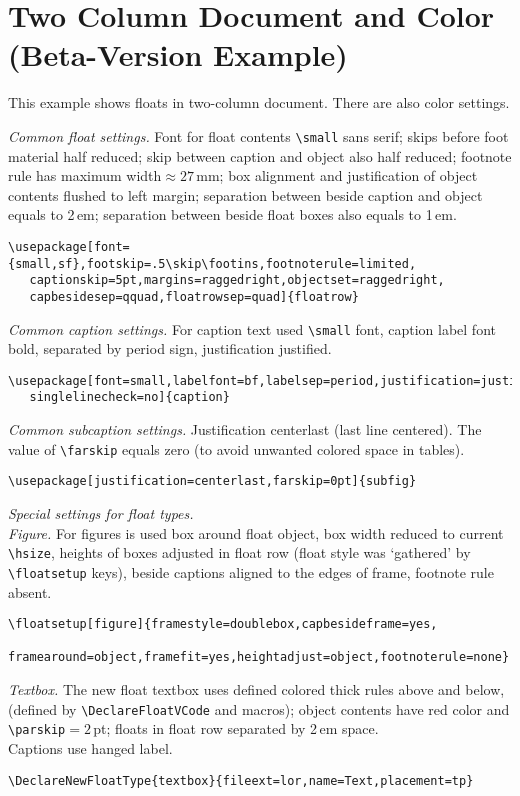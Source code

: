 \documentclass[twocolumn]{book}
\begin{document}

\onecolumn
\begingroup

\chapter{Two Column Document and Color (Beta-Version Example)}

\begin{sl}\fontsize{11}{13.6}\selectfont
This example shows floats in two-column document.
There are also color settings.

\emph{Common float settings.}
Font for float contents \verb|\small| sans serif;
skips before foot material half reduced;
skip between caption and object also half reduced;
footnote rule has maximum width${{}\approx27}$\,mm;
box alignment and justification of object contents flushed to left margin;
separation between beside caption and object equals to 2\,em; separation
between beside float boxes also equals to 1\,em.
\begin{verbatim}
\usepackage[font={small,sf},footskip=.5\skip\footins,footnoterule=limited,
   captionskip=5pt,margins=raggedright,objectset=raggedright,
   capbesidesep=qquad,floatrowsep=quad]{floatrow}
\end{verbatim}

\emph{Common caption settings.}
For caption text used \verb|\small| font, caption label font bold, separated
by period sign, justification justified.
\begin{verbatim}
\usepackage[font=small,labelfont=bf,labelsep=period,justification=justified,
   singlelinecheck=no]{caption}
\end{verbatim}

\emph{Common subcaption settings.}
Justification centerlast (last line centered). The value of \verb|\farskip|
equals zero (to avoid unwanted colored space in tables).
\begin{verbatim}
\usepackage[justification=centerlast,farskip=0pt]{subfig}
\end{verbatim}

\emph{Special settings for float types.}\\
\emph{Figure.}
For figures is used box around float object, box width reduced to
current \verb|\hsize|, heights of boxes adjusted in float row
(float style was `gathered' by \verb|\floatsetup| keys),
beside captions aligned to the edges of frame, footnote rule absent.
\begin{verbatim}
\floatsetup[figure]{framestyle=doublebox,capbesideframe=yes,
  framearound=object,framefit=yes,heightadjust=object,footnoterule=none}
\end{verbatim}
\emph{Textbox.}
The new float textbox uses defined colored thick rules above and below,
(defined by \verb|\DeclareFloatVCode| and macros);
object contents have red color and \verb|\parskip|${={}}2$\,pt;
floats in float row separated by 2\,em space.\\
Captions use hanged label.
\begin{verbatim}
\DeclareNewFloatType{textbox}{fileext=lor,name=Text,placement=tp}


\end{verbatim}
\end{sl}
\end{document}
